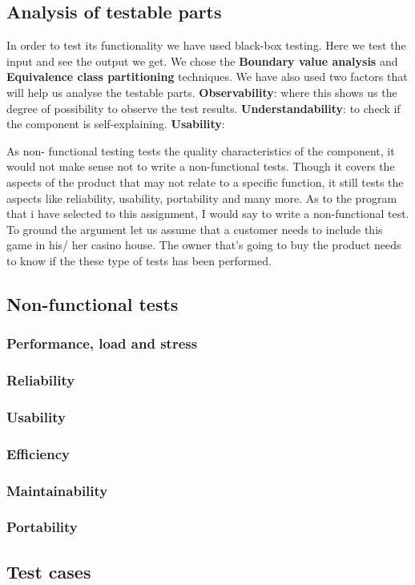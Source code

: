 \documentclass[UKenglish]{article}  %
\begin{document}
\subsection{Analysis of testable parts}
In order to test its functionality we have used black-box testing. Here we test
the input and see the output we get. We chose the \textbf{Boundary value analysis}
and \textbf{Equivalence class partitioning} techniques.
We have also used two factors that will help us analyse the testable parts.
\textbf{Observability}: where this shows us the degree of possibility to observe the
test results.
\textbf{Understandability}: to check if the component is self-explaining. 
\textbf{Usability}: 

As non- functional testing tests the quality characteristics of the component,
it would not make sense not to write a non-functional tests. 
Though it covers the aspects of the product that may not relate to a specific
function, it still tests the aspects like reliability, usability, portability
and many more. As to the program that i have selected to this assignment, I
would say to write a non-functional test. To ground the argument let us assume
that a customer needs to include this game in his/ her casino house.
The owner that’s going to buy the product needs to know  if the these type
of tests has been performed.

\subsection{Non-functional tests}

\subsubsection{Performance, load and stress}

\subsubsection{Reliability}

\subsubsection{Usability}

\subsubsection{Efficiency}

\subsubsection{Maintainability}

\subsubsection{Portability}

\subsection{Test cases}
\end{document}
